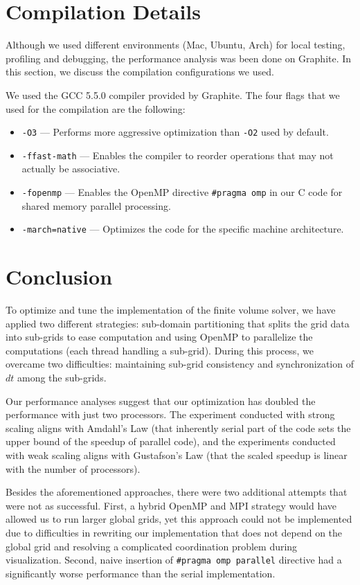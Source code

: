 \documentclass{article}
\begin{document}
\section{Compilation Details}

Although we used different environments (Mac, Ubuntu, Arch) for local testing, profiling and debugging,
the performance analysis was been done on Graphite. In this section, we discuss the compilation configurations we used.

We used the GCC 5.5.0 compiler provided by Graphite. The four flags that we used for the compilation are the following:
\begin{itemize}
	\item \texttt{-O3} --- Performs more aggressive optimization than \texttt{-O2} used by default.
	\item \texttt{-ffast-math} --- Enables the compiler to reorder operations that may not actually be associative.
	\item \texttt{-fopenmp} --- Enables the OpenMP directive \texttt{\#pragma omp} in our C code for shared memory parallel processing.
	\item \texttt{-march=native} --- Optimizes the code for the specific machine architecture.
\end{itemize}

\section{Conclusion}
To optimize and tune the implementation of the finite volume solver, we have applied two different strategies:
sub-domain partitioning that splits the grid data into sub-grids to ease computation and using OpenMP to parallelize
the computations (each thread handling a sub-grid).
During this process, we overcame two difficulties: maintaining sub-grid consistency and synchronization of $dt$ among the sub-grids.

Our performance analyses suggest that our optimization has doubled the performance with just two processors.
The experiment conducted with strong scaling aligns with Amdahl's Law (that inherently serial part of the code sets the upper bound of the speedup of parallel code),
and the experiments conducted with weak scaling aligns with Gustafson's Law (that the scaled speedup is linear with the number of processors).

Besides the aforementioned approaches, there were two additional attempts that were not as successful.
First, a hybrid OpenMP and MPI strategy would have allowed us to run larger global grids,
yet this approach could not be implemented due to difficulties in rewriting our implementation that does not depend on the global grid and resolving a complicated coordination problem during visualization.
Second, naive insertion of \texttt{\#pragma omp parallel} directive had a significantly worse performance than the serial implementation.
\end{document}
